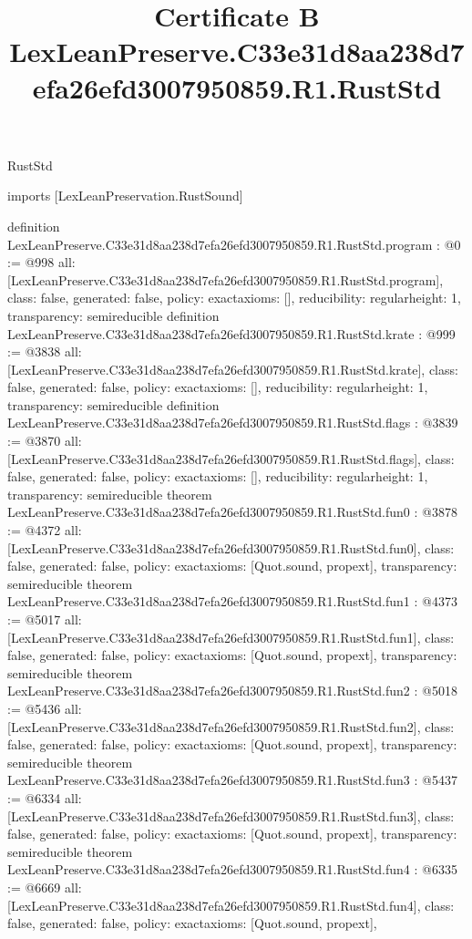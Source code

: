 \begin{lexlean}{RustStd}
\title{Certificate B LexLeanPreserve.C33e31d8aa238d7efa26efd3007950859.R1.RustStd}
\begin{coremodule}
imports [LexLeanPreservation.RustSound]

definition LexLeanPreserve.C33e31d8aa238d7efa26efd3007950859.R1.RustStd.program : @0 := @998 {
  all: [LexLeanPreserve.C33e31d8aa238d7efa26efd3007950859.R1.RustStd.program],
  class: false,
  generated: false,
  policy: exact{axioms: []},
  reducibility: regular{height: 1},
  transparency: semireducible
}
definition LexLeanPreserve.C33e31d8aa238d7efa26efd3007950859.R1.RustStd.krate : @999 := @3838 {
  all: [LexLeanPreserve.C33e31d8aa238d7efa26efd3007950859.R1.RustStd.krate],
  class: false,
  generated: false,
  policy: exact{axioms: []},
  reducibility: regular{height: 1},
  transparency: semireducible
}
definition LexLeanPreserve.C33e31d8aa238d7efa26efd3007950859.R1.RustStd.flags : @3839 := @3870 {
  all: [LexLeanPreserve.C33e31d8aa238d7efa26efd3007950859.R1.RustStd.flags],
  class: false,
  generated: false,
  policy: exact{axioms: []},
  reducibility: regular{height: 1},
  transparency: semireducible
}
theorem LexLeanPreserve.C33e31d8aa238d7efa26efd3007950859.R1.RustStd.fun0 : @3878 := @4372 {
  all: [LexLeanPreserve.C33e31d8aa238d7efa26efd3007950859.R1.RustStd.fun0],
  class: false,
  generated: false,
  policy: exact{axioms: [Quot.sound, propext]},
  transparency: semireducible
}
theorem LexLeanPreserve.C33e31d8aa238d7efa26efd3007950859.R1.RustStd.fun1 : @4373 := @5017 {
  all: [LexLeanPreserve.C33e31d8aa238d7efa26efd3007950859.R1.RustStd.fun1],
  class: false,
  generated: false,
  policy: exact{axioms: [Quot.sound, propext]},
  transparency: semireducible
}
theorem LexLeanPreserve.C33e31d8aa238d7efa26efd3007950859.R1.RustStd.fun2 : @5018 := @5436 {
  all: [LexLeanPreserve.C33e31d8aa238d7efa26efd3007950859.R1.RustStd.fun2],
  class: false,
  generated: false,
  policy: exact{axioms: [Quot.sound, propext]},
  transparency: semireducible
}
theorem LexLeanPreserve.C33e31d8aa238d7efa26efd3007950859.R1.RustStd.fun3 : @5437 := @6334 {
  all: [LexLeanPreserve.C33e31d8aa238d7efa26efd3007950859.R1.RustStd.fun3],
  class: false,
  generated: false,
  policy: exact{axioms: [Quot.sound, propext]},
  transparency: semireducible
}
theorem LexLeanPreserve.C33e31d8aa238d7efa26efd3007950859.R1.RustStd.fun4 : @6335 := @6669 {
  all: [LexLeanPreserve.C33e31d8aa238d7efa26efd3007950859.R1.RustStd.fun4],
  class: false,
  generated: false,
  policy: exact{axioms: [Quot.sound, propext]},
}
\end{coremodule}
\end{lexlean}
